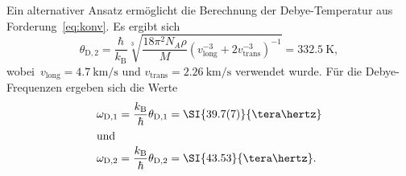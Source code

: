 %
Ein alternativer Ansatz ermöglicht die Berechnung der Debye-Temperatur aus
Forderung~\eqref{eq:konv}. Es ergibt sich
%
\begin{equation}
  \theta_{\mathrm{D},2}=\frac{\hbar}{k_{\mathrm{B}}}\sqrt[3]{\frac{18\pi^2N_A\rho}{M}\left(v_{\mathrm{long}}^{-3}+2v_{\mathrm{trans}}^{-3}\right)^{-1}}=\SI{332,5}{\kelvin},
\end{equation}
%
wobei~$v_{\mathrm{long}}=\SI{4.7}{\kilo\metre\per\second}$ und $v_{\mathrm{trans}}=\SI{2.26}{\kilo\metre\per\second}$ verwendet wurde.
Für die Debye-Frequenzen ergeben sich die Werte
%
\begin{align}
  \omega_{\mathrm{D},1}&=\frac{k_{\mathrm{B}}}{\hbar}\theta_{\mathrm{D},1}=\SI{39.7(7)}{\tera\hertz} \\
  \shortintertext{und}
  \omega_{\mathrm{D},2}&=\frac{k_{\mathrm{B}}}{\hbar}\theta_{\mathrm{D},2}=\SI{43.53}{\tera\hertz}.
\end{align}

